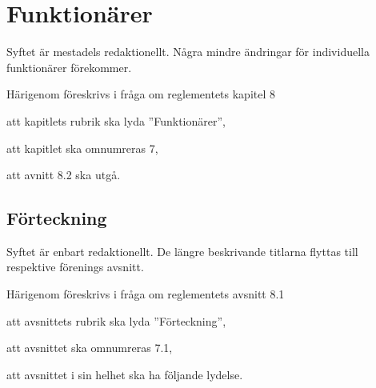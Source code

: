 \documentclass{article}
\begin{document}
\section{Funktionärer}
Syftet är mestadels redaktionellt. Några mindre ändringar för individuella funktionärer förekommer.

Härigenom föreskrivs i fråga om reglementets kapitel 8

\begin{dels}
    \item att kapitlets rubrik ska lyda ''Funktionärer'',
    \item att kapitlet ska omnumreras 7,
    \item att avnitt 8.2 ska utgå.
\end{dels}


\subsection{Förteckning}
Syftet är enbart redaktionellt. De längre beskrivande titlarna flyttas till respektive förenings avsnitt.

Härigenom föreskrivs i fråga om reglementets avsnitt 8.1

\begin{dels}
    \item att avsnittets rubrik ska lyda ''Förteckning'',
    \item att avsnittet ska omnumreras 7.1,
    \item att avsnittet i sin helhet ska ha följande lydelse.
\end{dels}
\end{document}
